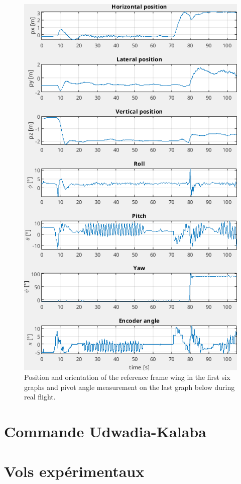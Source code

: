 \begin{figure}[h]
\centering
    \includegraphics[width=1\columnwidth,angle=0]{figures/colibri_flight.png}
    \caption{Position and orientation of the reference frame wing in the first six graphs and pivot angle measurement on the last graph below during real flight. }
    \label{fig:colibri_flight}
\end{figure}

\section{Commande Udwadia-Kalaba}

\section{Vols expérimentaux}







